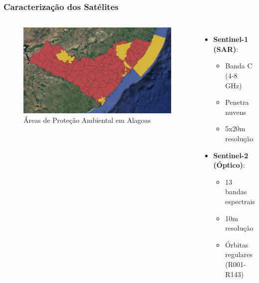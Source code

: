 \documentclass{beamer}
\begin{document}
\begin{frame}
    \frametitle{Caracterização dos Satélites}
    \begin{columns}
        \begin{figure}
            \includegraphics[width=\linewidth]{images/areas.png}
            \caption{Áreas de Proteção Ambiental em Alagoas}
        \end{figure}
        
        \begin{itemize}
            \item \textbf{Sentinel-1 (SAR)}:
            \begin{itemize}
                \item Banda C (4-8 GHz)
                \item Penetra nuvens
                \item 5x20m resolução
            \end{itemize}
            \item \textbf{Sentinel-2 (Óptico)}:
            \begin{itemize}
                \item 13 bandas espectrais
                \item 10m resolução
                \item Órbitas regulares (R001-R143)
            \end{itemize}
        \end{itemize}
    \end{columns}
\end{frame}
\end{document}
